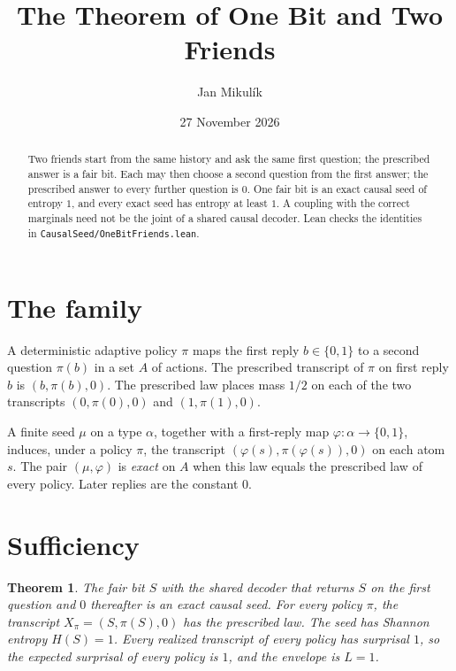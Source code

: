 \documentclass[11pt,a4paper]{article}
\title{\textbf{The Theorem of One Bit and Two Friends}}
\author{Jan Mikul\'ik}
\date{27 November 2026}
\newtheorem{theorem}{Theorem}
\theoremstyle{definition}
\theoremstyle{remark}
\begin{document}
\maketitle

\begin{abstract}
Two friends start from the same history and ask the same first question; the
prescribed answer is a fair bit. Each may then choose a second question from the
first answer; the prescribed answer to every further question is \(0\). One fair
bit is an exact causal seed of entropy \(1\), and every exact seed has entropy
at least \(1\). A coupling with the correct marginals need not be the joint of a
shared causal decoder. Lean checks the identities in
\texttt{CausalSeed/OneBitFriends.lean}.
\end{abstract}

\section{The family}

A deterministic adaptive policy \(\pi\) maps the first reply \(b\in\{0,1\}\) to
a second question \(\pi(b)\) in a set \(A\) of actions. The prescribed
transcript of \(\pi\) on first reply \(b\) is \((b,\pi(b),0)\). The prescribed
law places mass \(1/2\) on each of the two transcripts
\((0,\pi(0),0)\) and \((1,\pi(1),0)\).

A finite seed \(\mu\) on a type \(\alpha\), together with a first-reply map
\(\varphi:\alpha\to\{0,1\}\), induces, under a policy \(\pi\), the transcript
\((\varphi(s),\pi(\varphi(s)),0)\) on each atom \(s\). The pair \((\mu,\varphi)\)
is \emph{exact} on \(A\) when this law equals the prescribed law of every
policy. Later replies are the constant \(0\).

\section{Sufficiency}

\begin{theorem}
The fair bit \(S\) with the shared decoder that returns \(S\) on the first
question and \(0\) thereafter is an exact causal seed. For every policy
\(\pi\), the transcript \(X_\pi=(S,\pi(S),0)\) has the prescribed law. The seed
has Shannon entropy \(H(S)=1\). Every realized transcript of every policy has
surprisal \(1\), so the expected surprisal of every policy is \(1\), and the
envelope is \(L=1\).
\end{theorem}
\end{document}
